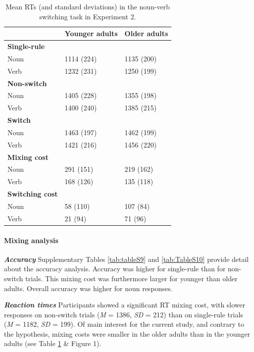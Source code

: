 \documentclass[
]{article}
\begin{document}
\begin{table}

\caption{\label{tab:Table7}Mean RTs (and standard deviations) in the noun-verb switching task in Experiment 2.}
\centering
\begin{tabular}[t]{lll}
\toprule
\textbf{} & \textbf{Younger adults} & \textbf{Older adults}\\
\midrule
\textbf{Single-rule} & \textbf{} & \textbf{}\\
Noun & 1114 (224) & 1135 (200)\\
Verb & 1232 (231) & 1250 (199)\\
\textbf{Non-switch} & \textbf{} & \textbf{}\\
Noun & 1405 (228) & 1355 (198)\\
\addlinespace
Verb & 1400 (240) & 1385 (215)\\
\textbf{Switch} & \textbf{} & \textbf{}\\
Noun & 1463 (197) & 1462 (199)\\
Verb & 1421 (216) & 1456 (220)\\
\textbf{Mixing cost} & \textbf{} & \textbf{}\\
\addlinespace
Noun & 291 (151) & 219 (162)\\
Verb & 168 (126) & 135 (118)\\
\textbf{Switching cost} & \textbf{} & \textbf{}\\
Noun & 58 (110) & 107 (84)\\
Verb & 21 (94) & 71 (96)\\
\bottomrule
\end{tabular}
\end{table}

\hypertarget{mixing-analysis-1}{%
\paragraph{Mixing analysis}\label{mixing-analysis-1}}

\hfill\break

\textbf{\emph{Accuracy}}
Supplementary Tables \ref{tab:tableS9} and \ref{tab:TableS10} provide detail about the accuracy analysis. Accuracy was higher for single-rule than for non-switch trials. This mixing cost was furthermore larger for younger than older adults. Overall accuracy was higher for noun responses.

\textbf{\emph{Reaction times}}
Participants showed a significant RT mixing cost, with slower responses on non-switch trials (\emph{M} = 1386, \emph{SD} = 212) than on single-rule trials (\emph{M} = 1182, \emph{SD} = 199). Of main interest for the current study, and contrary to the hypothesis, mixing costs were smaller in the older adults than in the younger adults (see Table \ref{tab:Table7} \& Figure 1).
\end{document}

